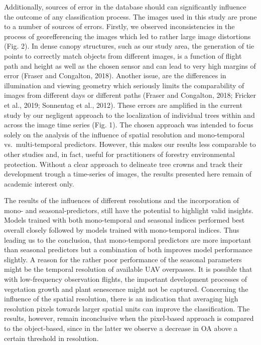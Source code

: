\documentclass[]{article}
\begin{document}
Additionally, sources of error in the database should can significantly
influence the outcome of any classification process. The images used in
this study are prone to a number of sources of errors. Firstly, we
observed inconsistencies in the process of georefferencing the images
which led to rather large image distortions (Fig. 2). In dense canopy
structures, such as our study area, the generation of tie points to
correctly match objects from different images, is a function of flight
path and height as well as the chosen sensor and can lead to very high
margins of error (Fraser and Congalton, 2018). Another issue, are the
differences in illumination and viewing geometry which seriously limits
the comparability of images from different days or different paths
(Fraser and Congalton, 2018; Fricker et al., 2019; Sonnentag et al.,
2012). These errors are amplified in the current study by our negligent
approach to the localization of individual trees within and across the
image time series (Fig. 1). The chosen approach was intended to focus
solely on the analysis of the influence of spatial resolution and
mono-temporal vs.~multi-temporal predictors. However, this makes our
results less comparable to other studies and, in fact, useful for
practitioners of forestry environmental protection. Without a clear
approach to delineate tree crowns and track their development trough a
time-series of images, the results presented here remain of academic
interest only.

The results of the influences of different resolutions and the
incorporation of mono- and seasonal-predictors, still have the potential
to highlight valid insights. Models trained with both mono-temporal and
seasonal indices performed best overall closely followed by models
trained with mono-temporal indices. Thus leading us to the conclusion,
that mono-temporal predictors are more important than seasonal
predictors but a combination of both improves model performance
slightly. A reason for the rather poor performance of the seasonal
parameters might be the temporal resolution of available UAV overpasses.
It is possible that with low-frequency observation flights, the
important development processes of vegetation growth and plant
senescence might not be captured. Concerning the influence of the
spatial resolution, there is an indication that averaging high
resolution pixels towards larger spatial units can improve the
classification. The results, however, remain inconclusive when the
pixel-based approach is compared to the object-based, since in the
latter we observe a decrease in OA above a certain threshold in
resolution.
\end{document}
